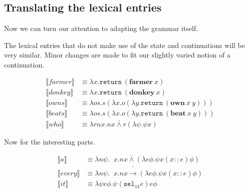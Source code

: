 \documentclass{article}
\newcommand{\dand}{\mathbin{\bar{\land}}}
\newcommand{\dimpl}{\mathbin{\bar{\to}}}
\newcommand{\dexists}{\mathop{\bar{\exists}}}
\newcommand{\dforall}{\mathop{\bar{\forall}}}
\newcommand{\occons}{\mathbin{::}}
\begin{document}

\subsection{Translating the lexical entries}

Now we can turn our attention to adapting the grammar itself.

The lexical entries that do not make use of the state and continuations will
be very similar. Minor changes are made to fit our slightly varied notion of a
continuation.

\begin{align*}
  \llbracket farmer \rrbracket & \equiv \lambda x.
    \texttt{return}\ (\textbf{farmer}\ x) \\
  \llbracket donkey \rrbracket & \equiv \lambda x.
    \texttt{return}\ (\textbf{donkey}\ x) \\
  \llbracket owns \rrbracket & \equiv \lambda o s.
    s (\lambda x. o (\lambda y. \texttt{return}\ (\textbf{own}\ x\ y))) \\
  \llbracket beats \rrbracket & \equiv \lambda o s.
    s (\lambda x. o (\lambda y. \texttt{return}\ (\textbf{beat}\ x\ y))) \\
  \llbracket who \rrbracket & \equiv \lambda r n x.
    n x \dand r (\lambda \psi. \psi x)
\end{align*}

Now for the interesting parts.

\begin{align*}
  \llbracket a \rrbracket & \equiv \lambda n \psi.
    \dexists x. n x \dand (\lambda e \phi. \psi x (x \occons e) \phi) \\
  \llbracket every \rrbracket & \equiv \lambda n \psi.
    \dforall x. n x \dimpl (\lambda e \phi. \psi x (x \occons e) \phi) \\
  \llbracket it \rrbracket & \equiv \lambda \psi e \phi.
    \psi (\texttt{sel}_\texttt{it} e) e \phi
\end{align*}
\end{document}
